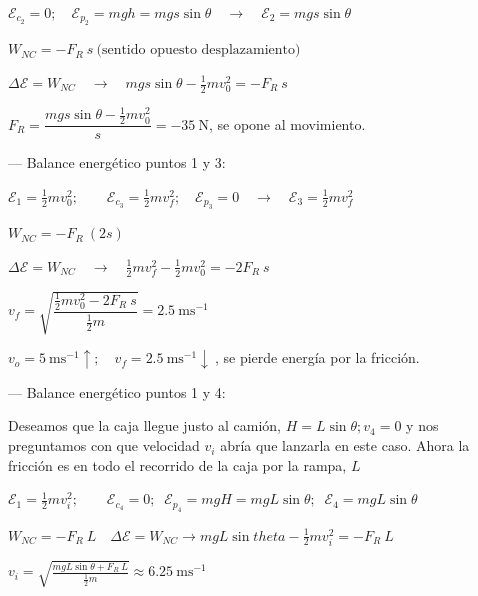 $\mathcal E_{c_2}=0;\quad \mathcal E_{p_2}=mgh=mgs \sin \theta \quad \to \quad \mathcal E_2=mgs \sin \theta$

$W_{NC}=-F_R  \ s \ \text{(sentido opuesto desplazamiento)}$

$\Delta \mathcal E=W_{NC} \quad \to \quad mgs \sin \theta - \frac 1 2 m v_0^2=-F_R \ s $

$F_R= \dfrac{mgs \sin \theta - \frac 1 2 m v_0^2}{s}=-35 \ \mathrm{N}$, se opone al movimiento.


\vspace{7mm} %
--- Balance energético puntos 1 y 3:

$\mathcal E_1=\frac 1 2 m v_0^2; \qquad \mathcal E_{c_3}=\frac 1 2 m v_f^2; \quad \mathcal E_{p_3}=0  \quad \to \quad \mathcal E_3=\frac 1 2 m v_f^2 $

$W_{NC}=-F_R\ (2s)$

$\Delta \mathcal E=W_{NC} \quad \to \quad \frac 1 2 m v_f^2-\frac 1 2 m v_0^2=-2F_R \ s$

$v_f=\sqrt{\dfrac{\frac 1 2 m v_0^2-2F_R\ s}{\frac 1 2 m}}=2.5\ \mathrm{ms}^{-1}$

$v_o=5\ \mathrm{ms}^{-1} \uparrow; \quad v_f=2.5\ \mathrm{ms}^{-1} \downarrow \ $, se pierde energía por la fricción.

\vspace{7mm} %
--- Balance energético puntos 1 y 4:

Deseamos que la caja llegue justo al camión, $H=L\sin \theta; v_4=0$ y nos preguntamos con que velocidad $v_i$ abría que lanzarla en este caso. Ahora la fricción es en todo el recorrido de la caja por la rampa, $L$

$\mathcal E_1=\frac 1 2 m v_i^2; \qquad \mathcal E_{c_4}=0;\;\; \mathcal E_{p_4}=mgH=mgL\sin \theta;\;\; \mathcal E_4=mgL\sin \theta$

$W_{NC}=-F_R\ L \quad \Delta \mathcal E=W_{NC} \to mgL\sin theta -\frac 1 2 m v_i^2=-F_R\ L$

$v_i=\sqrt{\frac{mgL\sin \theta + F_R\ L}{\frac 1 2 m}}\approx 6.25 \ \mathrm{m s}^{-1}$

